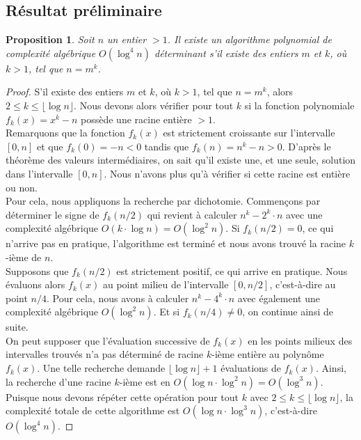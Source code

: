 \documentclass[11pt]{article}
\newtheorem{prop}{Proposition}[subsection]
\begin{document}
\subsection{Résultat préliminaire}

\begin{prop}
Soit $n$ un entier $>1$. Il existe un algorithme polynomial de complexité algébrique $O(\log^4 n)$ déterminant s'il existe des entiers $m$ et $k$, où $k>1$, tel que $n=m^k$.
\end{prop}

\begin{small}
\begin{proof}
S'il existe des entiers $m$ et $k$, où $k>1$, tel que $n=m^k$, alors $2 \leqslant k \leqslant \lfloor \log n \rfloor$. Nous devons alors vérifier pour tout $k$ si la fonction polynomiale $f_k(x)=x^k-n$ possède une racine entière $>1$.\\

\noindent
Remarquons que la fonction $f_k(x)$ est strictement croissante sur l'intervalle $[0,n]$ et que $f_k(0)=-n<0$ tandis que $f_k(n)=n^k-n>0$. D'après le théorème des valeurs intermédiaires, on sait qu'il existe une, et une seule, solution dans l'intervalle $[0,n]$. Nous n'avons plus qu'à vérifier si cette racine est entière ou non.\\

\noindent
Pour cela, nous appliquons la recherche par dichotomie. Commençons par déterminer le signe de $f_k(n/2)$ qui revient à calculer $n^k-2^k \cdot n$ avec une complexité algébrique $O(k \cdot \log n)=O(\log^2 n)$. Si $f_k(n/2)=0$, ce qui n'arrive pas en pratique, l'algorithme est terminé et nous avons trouvé la racine $k$-ième de $n$.\\

\noindent
Supposons que $f_k(n/2)$ est strictement positif, ce qui arrive en pratique. Nous évaluons alors $f_k(x)$ au point milieu de l'intervalle $[0,n/2]$, c'est-à-dire au point $n/4$. Pour cela, nous avons à calculer $n^k-4^k \cdot n$ avec également une complexité algébrique $O(\log^2 n)$. Et si $f_k(n/4) \not = 0$, on continue ainsi de suite.\\

\noindent
On peut supposer que l'évaluation successive de $f_k(x)$ en les points milieux des intervalles trouvés n'a pas déterminé de racine $k$-ième entière au polynôme $f_k(x)$. Une telle recherche demande $\lfloor \log n \rfloor +1$ évaluations de $f_k(x)$. Ainsi, la recherche d'une racine $k$-ième est en $O(\log n \cdot \log^2 n)=O(\log^3 n)$.\\

\noindent
Puisque nous devons répéter cette opération pour tout $k$ avec $2 \leqslant k \leqslant \lfloor \log n \rfloor$, la complexité totale de cette algorithme est $O(\log n \cdot \log^3 n)$, c'est-à-dire $O(\log^4 n)$.
\end{proof}
\end{small}
\end{document}
